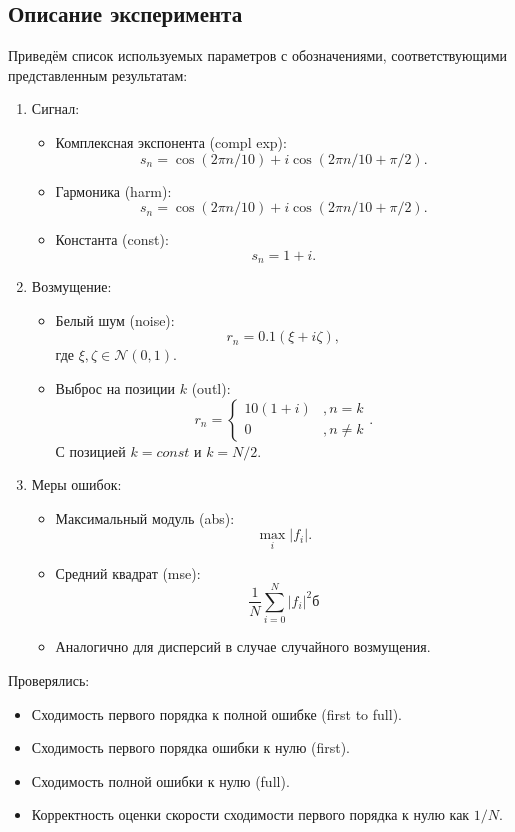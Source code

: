 \documentclass[specialist,
               substylefile = spbu.rtx,
               subf,href,colorlinks=true, 12pt]{disser}
\begin{document}
\subsection{Описание эксперимента}
Приведём список используемых параметров с обозначениями, соответствующими представленным результатам:
\begin{enumerate}
    \item Сигнал:
   \begin{itemize}
        \item Комплексная экспонента (compl exp):
        $$s_n = \cos(2 \pi n / 10) + i\cos(2 \pi n / 10 + \pi/2).$$
        \item Гармоника (harm):
        $$s_n = \cos(2 \pi n / 10) + i\cos(2 \pi n / 10 + \pi/2).$$
        \item Константа (const):
        $$s_n = 1 + i.$$
    \end{itemize}
    \item Возмущение:
    \begin{itemize}
        \item Белый шум (noise):
        $$r_n = 0.1 (\xi + i\zeta),$$
        где $\xi, \zeta \in \mathcal{N}(0, 1)$.
        \item Выброс на позиции $k$ (outl):
        $$r_n = \begin{cases}
            10(1 + i) & , n = k\\
            0 &, n \neq k
        \end{cases}.$$
        С позицией $k = const$ и $k = N/2$.
    \end{itemize}
    
    \item Меры ошибок: 
    \begin{itemize}
        \item Максимальный модуль (abs): 
        $$\max\limits_{i}|f_i|.$$
        \item Средний квадрат (mse):
        $$\frac{1}{N}\sum_{i=0}^{N}|f_i|^2б$$
        \item Аналогично для дисперсий в случае случайного возмущения.
    \end{itemize}

\end{enumerate}
Проверялись:
    \begin{itemize}
        \item Сходимость первого порядка к полной ошибке (first to full).
        \item Сходимость первого порядка ошибки к нулю (first).
        \item Сходимость полной ошибки к нулю (full).
        \item Корректность оценки скорости сходимости первого порядка к нулю как $1/N$.
    \end{itemize}
\end{document}
